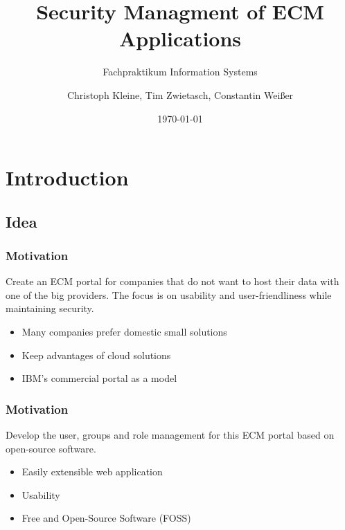 \documentclass{beamer}
\title{Security Managment of ECM Applications}
\subtitle{Fachpraktikum Information Systems}
\author{Christoph Kleine, Tim Zwietasch, Constantin Weißer}
\date{\today}
\begin{document}


\lstset{escapechar=@,style=customc}



\frame{\titlepage}

\section{Introduction}
\subsection{Idea}
\begin{frame}
	\frametitle{Motivation}
	\begin{tcolorbox}[title=Overall Goal]
		Create an ECM portal for companies that do not want to host
		their data with one of the big providers. The focus is on
		usability and user-friendliness while maintaining security.
	\end{tcolorbox}

	\begin{itemize}
		\item Many companies prefer domestic small solutions
		\item Keep advantages of cloud solutions
		\item IBM's commercial portal as a model
	\end{itemize}
\end{frame}

\begin{frame}
	\frametitle{Motivation}
	\begin{tcolorbox}[title=Our Goal]
		Develop the user, groups and role management for this ECM portal
		based on open-source software.
	\end{tcolorbox}
	\begin{itemize}
		\item Easily extensible web application
		\item Usability
		\item Free and Open-Source Software (FOSS)
	\end{itemize}
\end{frame}
\end{document}
